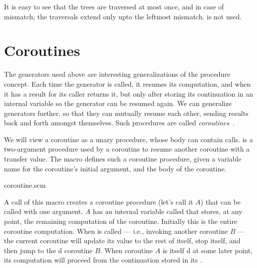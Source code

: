 
\n
It is easy to see that the trees are traversed at most
once, and in case of mismatch, the traversals extend
only upto the leftmost mismatch.   is not used.


\section{Coroutines}

The generators used above are interesting
generalizations of the procedure concept.  Each time
the generator is called, it resumes its computation,
and when it has a result for its caller returns it, but
only after storing its continuation in an internal
variable so the generator can be resumed again.  We can
generalize generators further, so that they can
mutually resume each other, sending results back and
forth amongst themselves.  Such procedures are called
{\em coroutines}~\cite{coroutine}.

We will view a coroutine as a unary procedure, whose
body can contain  calls.   is a
two-argument procedure used by a coroutine to resume
another coroutine with a transfer value.  The macro 
defines such a coroutine procedure, given a variable name for
the coroutine’s initial argument, and the body of the coroutine.

\scmfilename coroutine.scm


\n A call of this macro creates a coroutine procedure
(let’s call it $A$) that can be called with one
argument.  $A$ has an internal variable called
 that stores, at any point, the
remaining computation of the coroutine.   Initially
this is the entire coroutine computation.  When
 is called — i.e., invoking another coroutine
$B$ — the current coroutine will update its
 value to the rest of itself,
stop itself, and then jump to the d coroutine
$B$.  When coroutine $A$ is itself d at
some later point, its computation will proceed from the
continuation stored in its .

